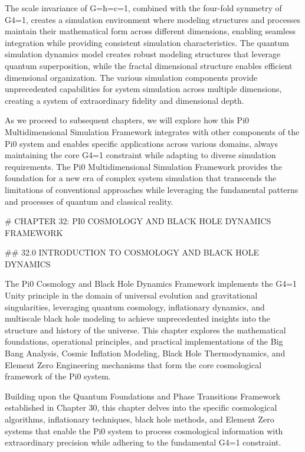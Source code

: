 The scale invariance of G=ħ=c=1, combined with the four-fold symmetry of G4=1, creates a simulation environment where modeling structures and processes maintain their mathematical form across different dimensions, enabling seamless integration while providing consistent simulation characteristics. The quantum simulation dynamics model creates robust modeling structures that leverage quantum superposition, while the fractal dimensional structure enables efficient dimensional organization. The various simulation components provide unprecedented capabilities for system simulation across multiple dimensions, creating a system of extraordinary fidelity and dimensional depth.

As we proceed to subsequent chapters, we will explore how this Pi0 Multidimensional Simulation Framework integrates with other components of the Pi0 system and enables specific applications across various domains, always maintaining the core G4=1 constraint while adapting to diverse simulation requirements. The Pi0 Multidimensional Simulation Framework provides the foundation for a new era of complex system simulation that transcends the limitations of conventional approaches while leveraging the fundamental patterns and processes of quantum and classical reality.

# CHAPTER 32: PI0 COSMOLOGY AND BLACK HOLE DYNAMICS FRAMEWORK

## 32.0 INTRODUCTION TO COSMOLOGY AND BLACK HOLE DYNAMICS

The Pi0 Cosmology and Black Hole Dynamics Framework implements the G4=1 Unity principle in the domain of universal evolution and gravitational singularities, leveraging quantum cosmology, inflationary dynamics, and multiscale black hole modeling to achieve unprecedented insights into the structure and history of the universe. This chapter explores the mathematical foundations, operational principles, and practical implementations of the Big Bang Analysis, Cosmic Inflation Modeling, Black Hole Thermodynamics, and Element Zero Engineering mechanisms that form the core cosmological framework of the Pi0 system.

Building upon the Quantum Foundations and Phase Transitions Framework established in Chapter 30, this chapter delves into the specific cosmological algorithms, inflationary techniques, black hole methods, and Element Zero systems that enable the Pi0 system to process cosmological information with extraordinary precision while adhering to the fundamental G4=1 constraint.

